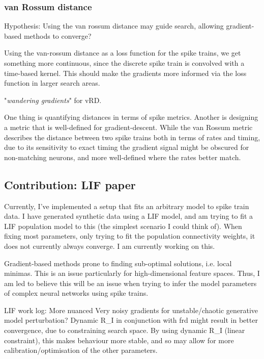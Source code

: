 \documentclass[mphil,deptreport,ai]{infthesis} %
\begin{document}
\subsubsection{van Rossum distance}
Hypothesis: Using the van rossum distance may guide search, allowing gradient-based methods to converge?

Using the van-rossum distance as a loss function for the spike trains, we get something more continuous, since the discrete spike train is convolved with a time-based kernel. This should make the gradients more informed via the loss function in larger search areas.

"\textit{wandering gradients}" for vRD.

One thing is quantifying distances in terms of spike metrics.
Another is designing a metric that is well-defined for gradient-descent.
While the van Rossum metric describes the distance between two spike trains both in terms of rates and timing, due to its sensitivity to exact timing the gradient signal might be obscured for non-matching neurons, and more well-defined where the rates better match.


\subsection{Contribution: LIF paper}
% 
Currently, I’ve implemented a setup that fits an arbitrary model to spike train data. I have generated synthetic data using a LIF model, and am trying to fit a LIF population model to this (the simplest scenario I could think of).
When fixing most parameters, only trying to fit the population connectivity weights, it does not currently always converge. I am currently working on this.

Gradient-based methods prone to finding sub-optimal solutions, i.e. local minimas. This is an issue particularly for high-dimensional feature spaces. Thus, I am led to believe this will be an issue when trying to infer the model parameters of complex neural networks using spike trains.

LIF work log:
More nuanced
Very noisy gradients for unstable/chaotic generative model perturbation?
Dynamic R\_I in conjunction with frd might result in better convergence, due to constraining search space.
By using dynamic R\_I (linear constraint), this makes behaviour more stable, and so may allow for more calibration/optimisation of the other parameters.
\end{document}
